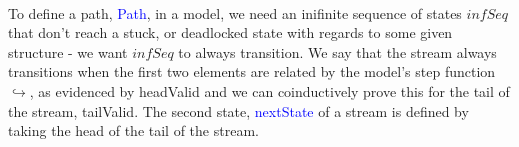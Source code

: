 \documentclass{article}
\newcommand{\blue}[1]{\textcolor{blue}{#1}}
\newcommand{\pink}[1]{\textcolor{hotmagenta}{#1}}
\begin{document}
\begin{code}[hide]%
\>[0]\AgdaSpace{}%
\AgdaSpace{}%
\AgdaSymbol{(}\AgdaSpace{}%
\AgdaSymbol{:}\AgdaSpace{}%
\AgdaSymbol{)}\AgdaSpace{}%
\AgdaSymbol{(}\AgdaSpace{}%
\AgdaSymbol{:}\AgdaSpace{}%
\AgdaSpace{}%
\AgdaSymbol{)}\AgdaSpace{}%
\<%
\\
\>[0][@{}l@{\AgdaIndent{0}}]%
\>[2]\AgdaSpace{}%
\AgdaSpace{}%
\AgdaSpace{}%
\<%
\\
%
\>[2]\AgdaSpace{}%
\AgdaSpace{}%
\<%
\end{code}
\begin{code}%
%
\>[2]\AgdaSpace{}%
\AgdaSpace{}%
\AgdaSymbol{:}\AgdaSpace{}%
\AgdaSpace{}%
\<%
\\
\>[2][@{}l@{\AgdaIndent{0}}]%
\>[4]\<%
\\
%
\>[4]\<%
\\
\>[4][@{}l@{\AgdaIndent{0}}]%
\>[6]\AgdaSpace{}%
\AgdaSymbol{:}\AgdaSpace{}%
\<%
\\
%
\>[6]\AgdaSpace{}%
\AgdaSymbol{:}\AgdaSpace{}%
\<%
\end{code}
\begin{code}[hide]%
%
\>[2]\AgdaSpace{}%
\<%
\end{code}

To define a path, \blue{Path}, in a model, we need an inifinite sequence of
states \pink{$infSeq$} that don't reach a stuck, or deadlocked state with
regards to some given structure - we want \pink{$infSeq$} to always transition.
We say that the stream always transitions when the first two elements are
related by the model's step function \pink{$\hookrightarrow$}, as evidenced by
\pink{headValid} and we can coinductively prove this for the tail of the stream,
\pink{tailValid}. The second state, \blue{nextState} of a stream is defined by taking
the head of the tail of the stream.
\end{document}
